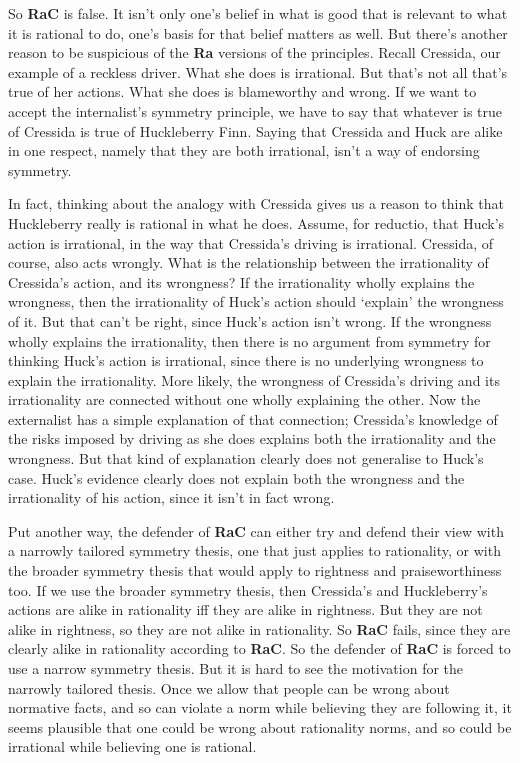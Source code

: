 So \textbf{RaC} is false. It isn't only one's belief in what is good that is relevant to what it is rational to do, one's basis for that belief matters as well. But there's another reason to be suspicious of the \textbf{Ra} versions of the principles. Recall \gls{Cressida}, our example of a reckless driver. What she does is irrational. But that's not all that's true of her actions. What she does is blameworthy and wrong. If we want to accept the internalist's symmetry principle, we have to say that whatever is true of \gls{Cressida} is true of \gls{Huck}leberry Finn. Saying that \gls{Cressida} and \gls{Huck} are alike in one respect, namely that they are both irrational, isn't a way of endorsing symmetry.

In fact, thinking about the analogy with \gls{Cressida} gives us a reason to think that \gls{Huck}leberry really is rational in what he does. Assume, for reductio, that \gls{Huck}'s action is irrational, in the way that \gls{Cressida}'s driving is irrational. \gls{Cressida}, of course, also acts wrongly. What is the relationship between the irrationality of \gls{Cressida}'s action, and its wrongness? If the irrationality wholly explains the wrongness, then the irrationality of \gls{Huck}'s action should `explain' the wrongness of it. But that can't be right, since \gls{Huck}'s action isn't wrong. If the wrongness wholly explains the irrationality, then there is no argument from symmetry for thinking \gls{Huck}'s action is irrational, since there is no underlying wrongness to explain the irrationality. More likely, the wrongness of \gls{Cressida}'s driving and its irrationality are connected without one wholly explaining the other. Now the externalist has a simple explanation of that connection; \gls{Cressida}'s knowledge of the risks imposed by driving as she does explains both the irrationality and the wrongness. But that kind of explanation clearly does not generalise to \gls{Huck}'s case. \gls{Huck}'s evidence clearly does not explain both the wrongness and the irrationality of his action, since it isn't in fact wrong.

Put another way, the defender of \textbf{RaC} can either try and defend their view with a narrowly tailored symmetry thesis, one that just applies to rationality, or with the broader symmetry thesis that would apply to rightness and praiseworthiness too. If we use the broader symmetry thesis, then \gls{Cressida}'s and \gls{Huck}leberry's actions are alike in rationality iff they are alike in rightness. But they are not alike in rightness, so they are not alike in rationality. So \textbf{RaC} fails, since they are clearly alike in rationality according to \textbf{RaC}. So the defender of \textbf{RaC} is forced to use a narrow symmetry thesis. But it is hard to see the motivation for the narrowly tailored thesis. Once we allow that people can be wrong about normative facts, and so can violate a norm while believing they are following it, it seems plausible that one could be wrong about rationality norms, and so could be irrational while believing one is rational.

